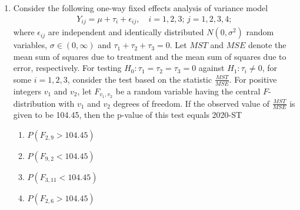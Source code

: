 \documentclass[journal]{IEEEtran}
\begin{document}
\begin{enumerate}
\item Consider the following one-way fixed effects analysis of variance model
\begin{align*}
Y_{ij} = \mu + \tau_i + \epsilon_{ij}, \quad i = 1, 2, 3; \, j = 1, 2, 3, 4;
\end{align*}
where $\epsilon_{ij}$ are independent and identically distributed $N(0, \sigma^2)$ random variables, $\sigma \in (0, \infty)$ and $\tau_1 + \tau_2 + \tau_3 = 0$. Let $MST$ and $MSE$ denote the mean sum of squares due to treatment and the mean sum of squares due to error, respectively. For testing $H_0: \tau_1 = \tau_2 = \tau_3 = 0$ against $H_1: \tau_i \neq 0$, for some $i = 1, 2, 3$, consider the test based on the statistic $\frac{MST}{MSE}$. For positive integers $v_1$ and $v_2$, let $F_{v_1, v_2}$ be a random variable having the central $F$-distribution with $v_1$ and $v_2$ degrees of freedom. If the observed value of $\frac{MST}{MSE}$ is given to be 104.45, then the p-value of this test equals
\hfill{2020-ST}
\begin{enumerate}
    \item $P(F_{2,9} > 104.45)$
    \item $P(F_{9,2} < 104.45)$
    \item $P(F_{3,11} < 104.45)$
    \item $P(F_{2,6} > 104.45)$
\end{enumerate}







\end{enumerate}
\end{document}
